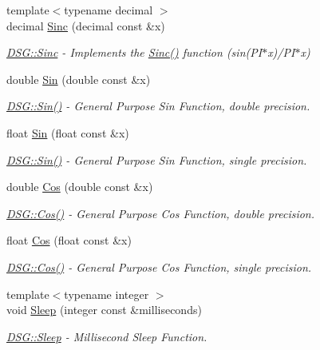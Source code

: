 \begin{DoxyCompactItemize}
\item 
{\footnotesize template$<$typename decimal $>$ }\\decimal \hyperlink{namespace_d_s_g_a6a99a1c242cddf18f4387f51ec8606b4}{Sinc} (decimal const \&x)
\begin{DoxyCompactList}\small\item\em \hyperlink{namespace_d_s_g_a6a99a1c242cddf18f4387f51ec8606b4}{D\+S\+G\+::\+Sinc} -\/ Implements the \hyperlink{namespace_d_s_g_a6a99a1c242cddf18f4387f51ec8606b4}{Sinc()} function (sin(\+P\+I$\ast$x)/\+P\+I$\ast$x) \end{DoxyCompactList}\item 
double \hyperlink{namespace_d_s_g_aad63d316081c7d13a551acf346ee2749}{Sin} (double const \&x)
\begin{DoxyCompactList}\small\item\em \hyperlink{namespace_d_s_g_aad63d316081c7d13a551acf346ee2749}{D\+S\+G\+::\+Sin()} -\/ General Purpose Sin Function, double precision. \end{DoxyCompactList}\item 
float \hyperlink{namespace_d_s_g_aa2f9baa8896fff266c5e7ee73fb5c3d5}{Sin} (float const \&x)
\begin{DoxyCompactList}\small\item\em \hyperlink{namespace_d_s_g_aad63d316081c7d13a551acf346ee2749}{D\+S\+G\+::\+Sin()} -\/ General Purpose Sin Function, single precision. \end{DoxyCompactList}\item 
double \hyperlink{namespace_d_s_g_ade303ad15c77f534429305c3cbd90191}{Cos} (double const \&x)
\begin{DoxyCompactList}\small\item\em \hyperlink{namespace_d_s_g_ade303ad15c77f534429305c3cbd90191}{D\+S\+G\+::\+Cos()} -\/ General Purpose Cos Function, double precision. \end{DoxyCompactList}\item 
float \hyperlink{namespace_d_s_g_a214b00c1735dd1976757f284dfe6fb1f}{Cos} (float const \&x)
\begin{DoxyCompactList}\small\item\em \hyperlink{namespace_d_s_g_ade303ad15c77f534429305c3cbd90191}{D\+S\+G\+::\+Cos()} -\/ General Purpose Cos Function, single precision. \end{DoxyCompactList}\item 
{\footnotesize template$<$typename integer $>$ }\\void \hyperlink{namespace_d_s_g_a012c968132bda114752f8ae012a1f441}{Sleep} (integer const \&milliseconds)
\begin{DoxyCompactList}\small\item\em \hyperlink{namespace_d_s_g_a012c968132bda114752f8ae012a1f441}{D\+S\+G\+::\+Sleep} -\/ Millisecond Sleep Function. \end{DoxyCompactList}\end{DoxyCompactItemize}


